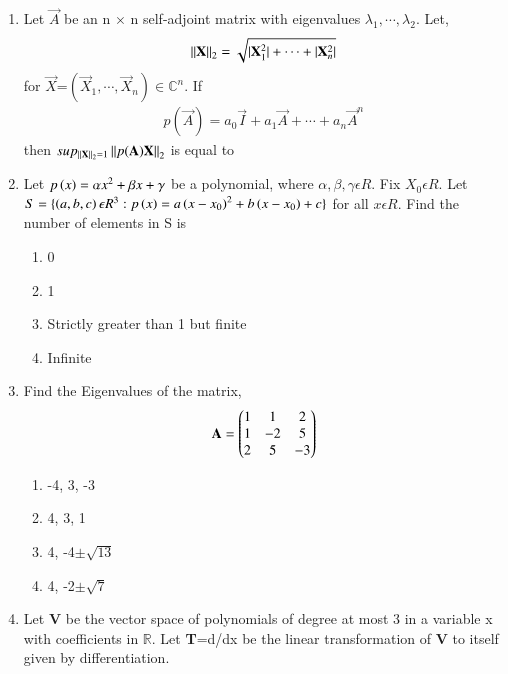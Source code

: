 \renewcommand{\theequation}{\theenumi}
\renewcommand{\thefigure}{\theenumi}
\begin{enumerate}[label=\thesection.\arabic*.,ref=\thesection.\theenumi]

\item Let $\vec{A}$ be an n $\times$ n self-adjoint matrix with eigenvalues $\lambda_1, \cdots, \lambda_2$.
Let,\begin{align} \left\lVert\mathbf{X}\right\rVert_2=\sqrt{\vert\mathbf{X}_{1}^{2}\vert+\cdots+\vert\mathbf{X}_{n}^{2}\vert}\end{align} for $\vec{X}$=$(\vec{X}_{1},\cdots,\vec{X}_{n})\in \mathbb{C}^n$. If \begin{align}
p(\vec{A})=a_0\vec{I}+a_1\vec{A}+\cdots+a_n\vec{A}^n
\end{align}
then $sup_{\left\lVert\mathbf{X}\right\rVert_{2}=1}\left\lVert p(\mathbf{A})\mathbf{X}\right\rVert_2$ is equal to
%
\\
\solution

\item Let $p \left(x\right)= \alpha x^2+\beta x + \gamma$ be a polynomial, where $\alpha,\beta,\gamma \epsilon R$. Fix $X_0 \epsilon R$. Let $S=\{\left(a,b,c\right)  \epsilon R^3: p \left(x\right)= a \left(x-x_0\right)^2+b \left(x-x_0\right)+ c\}$ for all $x\epsilon R$. Find the number of elements in S is
\begin{enumerate}
    \item 0
    \item 1
    \item Strictly greater than 1 but finite
    \item Infinite
\end{enumerate}
%
\solution

%
\item Find the Eigenvalues of the matrix,
\begin{align}
\mathbf{A} = \begin{pmatrix}1 & 1 & 2 \\ 1 & -2 & 5 \\ 2 & 5 & -3 \end{pmatrix}\label{eq:solutions/2017/june/32/eq:1}
\end{align}
\begin{enumerate}
\item -4, 3, -3
\item 4, 3, 1
\item 4, -4$\pm\sqrt{13}$
\item 4, -2$\pm\sqrt{7}$
\end{enumerate}
%
%
\solution


\item Let \textbf{V} be the vector space of polynomials of degree at most 3 in a variable x with coefficients in $\mathbb{R}$. Let \textbf{T}=d/dx be the linear transformation of \textbf{V} to itself given by differentiation.\\


\end{enumerate}
